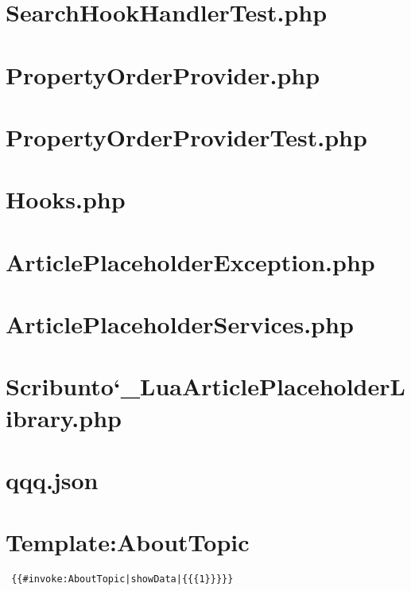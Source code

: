 \section{SearchHookHandlerTest.php}


\section{PropertyOrderProvider.php}


\section{PropertyOrderProviderTest.php}


\section{Hooks.php}


\section{ArticlePlaceholderException.php}


\section{ArticlePlaceholderServices.php}


\section{Scribunto\char`_LuaArticlePlaceholderLibrary.php}


\section{qqq.json}


\section{Template:AboutTopic}
\begin{lstlisting}
 {{#invoke:AboutTopic|showData|{{{1}}}}}
\end{lstlisting}


